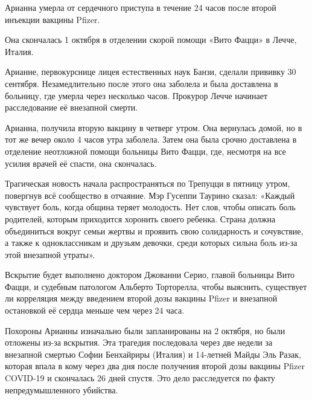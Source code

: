 Арианна умерла от сердечного приступа в течение 24 часов после второй инъекции
вакцины Pfizer.

Она скончалась 1 октября в отделении скорой помощи «Вито Фацци» в Лечче, Италия.

Арианне, первокурснице лицея естественных наук Банзи, сделали прививку 30
сентября. Незамедлительно после этого она заболела и была доставлена в больницу,
где умерла через несколько часов. Прокурор Лечче начинает расследование её
внезапной смерти.

Арианна, получила вторую вакцину в четверг утром. Она вернулась домой, но в тот
же вечер около 4 часов утра заболела. Затем она была срочно доставлена в
отделение неотложной помощи больницы Вито Фацци, где, несмотря на все усилия
врачей её спасти, она скончалась.

Трагическая новость начала распространяться по Трепуцци в пятницу утром,
повергнув всё сообщество в отчаяние. Мэр Гусеппи Таурино сказал: «Каждый
чувствует боль, когда община теряет молодость. Нет слов, чтобы описать боль
родителей, которым приходится хоронить своего ребенка. Страна должна
объединиться вокруг семьи жертвы и проявить свою солидарность и сочувствие, а
также к одноклассникам и друзьям девочки, среди которых сильна боль из-за этой
внезапной утраты».

Вскрытие будет выполнено доктором Джованни Серио, главой больницы Вито Фацци, и
судебным патологом Альберто Торторелла, чтобы выяснить, существует ли корреляция
между введением второй дозы вакцины Pfizer и внезапной остановкой её сердца
меньше чем через 24 часа.

Похороны Арианны изначально были запланированы на 2 октября, но были отложены
из-за вскрытия. Эта трагедия последовала через две недели за внезапной смертью
Софии Бенхайриры (Италия) и 14-летней Майды Эль Разак, которая впала в кому
через два дня после получения второй дозы вакцины Pfizer COVID-19 и скончалась
26 дней спустя. Это дело расследуется по факту непредумышленного убийства.

